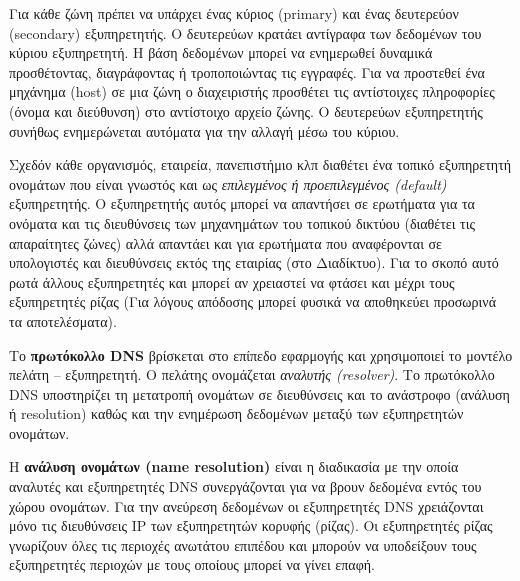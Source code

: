 Για κάθε ζώνη πρέπει να υπάρχει ένας κύριος (primary) και ένας δευτερεύον (secondary) εξυπηρετητής. O δευτερεύων κρατάει αντίγραφα των δεδομένων του κύριου εξυπηρετητή. Η βάση δεδομένων μπορεί να ενημερωθεί δυναμικά προσθέτοντας, διαγράφοντας ή τροποποιώντας τις εγγραφές. Για να προστεθεί ένα μηχάνημα (host) σε μια ζώνη ο διαχειριστής προσθέτει τις αντίστοιχες πληροφορίες (όνομα και διεύθυνση) στο αντίστοιχο αρχείο ζώνης. Ο δευτερεύων εξυπηρετητής συνήθως ενημερώνεται αυτόματα για την αλλαγή μέσω του κύριου.

Σχεδόν κάθε οργανισμός, εταιρεία, πανεπιστήμιο κλπ διαθέτει ένα τοπικό εξυπηρετητή ονομάτων που είναι γνωστός και ως \emph{επιλεγμένος ή προεπιλεγμένος (default)} εξυπηρετητής. Ο εξυπηρετητής αυτός μπορεί να απαντήσει σε ερωτήματα για τα ονόματα και τις διευθύνσεις των μηχανημάτων του τοπικού δικτύου (διαθέτει τις απαραίτητες ζώνες) αλλά απαντάει και για ερωτήματα που αναφέρονται σε υπολογιστές και διευθύνσεις εκτός της εταιρίας (στο Διαδίκτυο). Για το σκοπό αυτό ρωτά άλλους εξυπηρετητές και μπορεί αν χρειαστεί να φτάσει και μέχρι τους εξυπηρετητές ρίζας (Για λόγους απόδοσης μπορεί φυσικά να αποθηκεύει προσωρινά τα αποτελέσματα).

Το \textbf{πρωτόκολλο DNS} βρίσκεται στο επίπεδο εφαρμογής και χρησιμοποιεί το μοντέλο πελάτη -- εξυπηρετητή. Ο πελάτης ονομάζεται \emph{αναλυτής (resolver)}. Το πρωτόκολλο DNS υποστηρίζει τη μετατροπή ονομάτων σε διευθύνσεις και το ανάστροφο (ανάλυση ή resolution) καθώς και την ενημέρωση δεδομένων μεταξύ των εξυπηρετητών ονομάτων.

Η \textbf{ανάλυση ονομάτων (name resolution)} είναι η διαδικασία με την οποία αναλυτές και εξυπηρετητές DNS συνεργάζονται για να βρουν δεδομένα εντός του χώρου ονομάτων. Για την ανεύρεση δεδομένων οι εξυπηρετητές DNS χρειάζονται μόνο τις διευθύνσεις IP των εξυπηρετητών κορυφής (ρίζας). Οι εξυπηρετητές ρίζας γνωρίζουν όλες τις περιοχές ανωτάτου επιπέδου και μπορούν να υποδείξουν τους εξυπηρετητές περιοχών με τους οποίους μπορεί να γίνει επαφή.